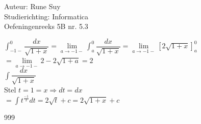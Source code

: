 \documentclass[a4paper]{article}
\newcommand{\limit}{\lim\limits}
\newcommand{\Int}{\displaystyle\int}
\begin{document}
  
\noindent \large Auteur: Rune Suy \\
\noindent \large Studierichting: Informatica\\
\noindent \large Oefeningenreeks 5B nr. 5.3\\

\medskip

\normalsize

$\Int_{-1-}^0 \dfrac{dx}{\sqrt{1+x}} = \limit_{a\rightarrow-1-} \Int_{a}^0 \dfrac{dx}{\sqrt{1+x}} = \limit_{a\rightarrow-1-} \left[2\sqrt{1+x}\right]_a^0$\\

$= \limit_{a\rightarrow-1-} 2 - 2\sqrt{1+a} = 2$\\

$\Int \dfrac{dx}{\sqrt{1+x}}$\\

Stel $t=1=x \Rightarrow dt=dx$\\

$= \Int t^{\tfrac{-1}{2}}dt = 2\sqrt{t}+c = 2\sqrt{1+x}+c$\\

\begin{thebibliography}{999}
\end{thebibliography}
\end{document}
